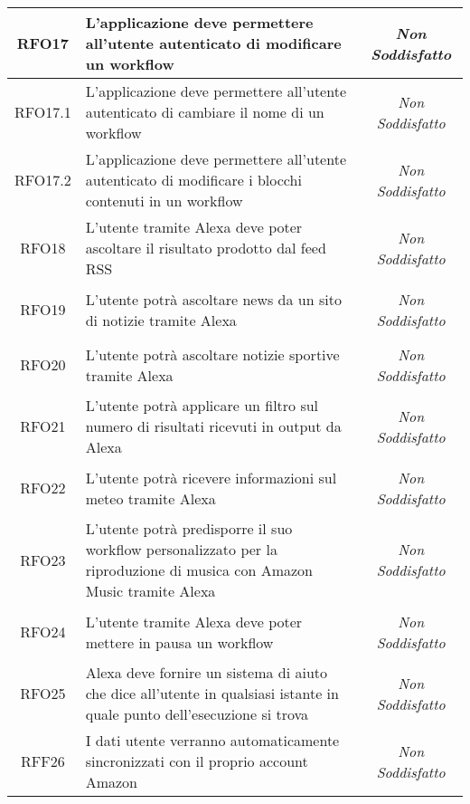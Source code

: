 \begin{longtable}{|c|>{\centering}m{7cm}|c|}
	\hypertarget{RFO17}{RFO17} & L'applicazione deve permettere all'utente autenticato di modificare un workflow & {\textit{Non Soddisfatto}}\\ \hline
	
	\hypertarget{RFO17.1}{RFO17.1} & L'applicazione deve permettere all'utente autenticato di cambiare il nome di un workflow & {\textit{Non Soddisfatto}}\\ \hline
	
	\hypertarget{RFO17.2}{RFO17.2} & L'applicazione deve permettere all'utente autenticato di modificare i blocchi contenuti in un workflow & {\textit{Non Soddisfatto}}\\ \hline
	
	\hypertarget{RFO18}{RFO18} & L'utente tramite Alexa deve poter ascoltare il risultato prodotto dal feed RSS & {\textit{Non Soddisfatto}}\\ \hline
	
	\hypertarget{RFO19}{RFO19} & L'utente potrà ascoltare news da un sito di notizie tramite Alexa & {\textit{Non Soddisfatto}}\\ \hline
	
	\hypertarget{RFO20}{RFO20} & L'utente potrà ascoltare notizie sportive tramite Alexa & {\textit{Non Soddisfatto}}\\ \hline
	
	\hypertarget{RFO21}{RFO21} & L'utente potrà applicare un filtro sul numero di risultati ricevuti in output da Alexa & {\textit{Non Soddisfatto}}\\ \hline
	
	\hypertarget{RFO22}{RFO22} & L'utente potrà ricevere informazioni sul meteo tramite Alexa & {\textit{Non Soddisfatto}}\\ \hline
	
	\hypertarget{RFO23}{RFO23} & L'utente potrà predisporre il suo workflow personalizzato per la riproduzione di musica con Amazon Music tramite Alexa & {\textit{Non Soddisfatto}}\\ \hline
	
	\hypertarget{RFO24}{RFO24} & L'utente tramite Alexa deve poter mettere in pausa un workflow & {\textit{Non Soddisfatto}}\\ \hline
	
	\hypertarget{RFO25}{RFO25} & Alexa deve fornire un sistema di aiuto che dice all'utente in qualsiasi istante in quale punto dell'esecuzione si trova & {\textit{Non Soddisfatto}}\\ \hline
	
	\hypertarget{RFF26}{RFF26} & I dati utente verranno automaticamente sincronizzati con il proprio account Amazon & {\textit{Non Soddisfatto}}\\ \hline
	

\end{longtable}
